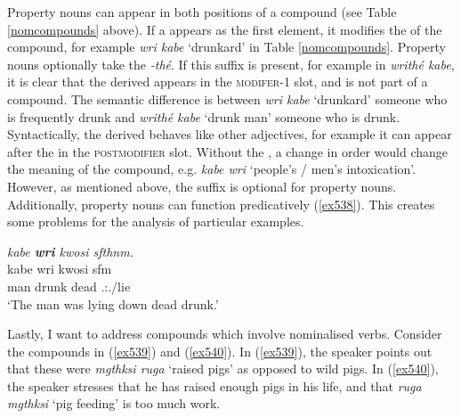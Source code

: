 Property nouns can appear in both positions of a compound (see Table \ref{nomcompounds} above). If a  appears as the first element, it modifies the  of the compound, for example \emph{wri kabe} `drunkard' in Table \ref{nomcompounds}. Property nouns optionally take the  \emph{-thé}. If this suffix is present, for example in \emph{writhé kabe}, it is clear that the derived  appears in the \textsc{modifer-1} slot, and is not part of a compound. The semantic difference is between \emph{wri kabe} `drunkard' \textendash{} someone who is frequently drunk \textendash{} and \emph{writhé kabe} `drunk man' \textendash{} someone who is drunk. Syntactically, the derived  behaves like other adjectives, for example it can appear after the  in the \textsc{postmodifier} slot. Without the , a change in order would change the meaning of the compound, e.g. \emph{kabe wri} `people's / men's intoxication'. However, as mentioned above, the  suffix is optional for property nouns. Additionally, property nouns can function predicatively (\ref{ex538}). This creates some problems for the analysis of particular examples.

\begin{exe}
	\ex \emph{kabe \textbf{wri} kwosi sfthnm.}\\
	\gll kabe wri kwosi sfm\\
	man drunk dead \Tsg{}.\Masc{}:\Pst{}.\Dur{}/lie\\
	\trans `The man was lying down dead drunk.'\\
	\label{ex538}
\end{exe}

Lastly, I want to address compounds which involve nominalised verbs. Consider the compounds in (\ref{ex539}) and (\ref{ex540}). In (\ref{ex539}), the speaker points out that these were \emph{mgthksi ruga} `raised pigs' as opposed to wild pigs. In (\ref{ex540}), the speaker stresses that he has raised enough pigs in his life, and that \emph{ruga mgthksi} `pig feeding' is too much work.

